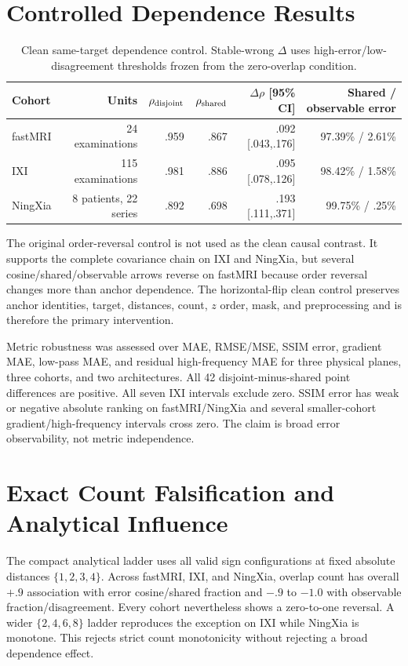 \documentclass[10pt,twocolumn,letterpaper]{article}
\begin{document}
\section{Controlled Dependence Results}
\begin{table}[t]
\centering
\caption{Clean same-target dependence control. Stable-wrong $\Delta$ uses high-error/low-disagreement thresholds frozen from the zero-overlap condition.}
\label{tab:clean-full}
\setlength{\tabcolsep}{4pt}
\begin{tabular}{lrrrrr}
\toprule
Cohort & Units & $\rho_{\rm disjoint}$ & $\rho_{\rm shared}$ & $\Delta\rho$ [95\% CI] & Shared / observable error \\
\midrule
fastMRI & 24 examinations & .959 & .867 & .092 [.043,.176] & 97.39\% / 2.61\% \\
IXI & 115 examinations & .981 & .886 & .095 [.078,.126] & 98.42\% / 1.58\% \\
NingXia & 8 patients, 22 series & .892 & .698 & .193 [.111,.371] & 99.75\% / .25\% \\
\bottomrule
\end{tabular}
\end{table}

The original order-reversal control is not used as the clean causal contrast. It supports the complete covariance chain on IXI and NingXia, but several cosine/shared/observable arrows reverse on fastMRI because order reversal changes more than anchor dependence. The horizontal-flip clean control preserves anchor identities, target, distances, count, $z$ order, mask, and preprocessing and is therefore the primary intervention.

Metric robustness was assessed over MAE, RMSE/MSE, SSIM error, gradient MAE, low-pass MAE, and residual high-frequency MAE for three physical planes, three cohorts, and two architectures. All 42 disjoint-minus-shared point differences are positive. All seven IXI intervals exclude zero. SSIM error has weak or negative absolute ranking on fastMRI/NingXia and several smaller-cohort gradient/high-frequency intervals cross zero. The claim is broad error observability, not metric independence.

\section{Exact Count Falsification and Analytical Influence}
The compact analytical ladder uses all valid sign configurations at fixed absolute distances $\{1,2,3,4\}$. Across fastMRI, IXI, and NingXia, overlap count has overall $+.9$ association with error cosine/shared fraction and $-.9$ to $-1.0$ with observable fraction/disagreement. Every cohort nevertheless shows a zero-to-one reversal. A wider $\{2,4,6,8\}$ ladder reproduces the exception on IXI while NingXia is monotone. This rejects strict count monotonicity without rejecting a broad dependence effect.
\end{document}
